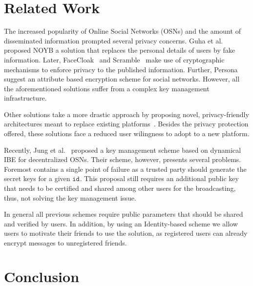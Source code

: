 \documentclass[journal]{IEEEtran}
\newcommand{\id}[1]{\ensuremath{\mathtt{id}_{#1}}}
\begin{document}
\section{Related Work}\label{sec:relwork}
The increased popularity of Online Social Networks (OSNs) and the amount of disseminated information prompted several privacy concerns. 
Guha et al.~\cite{Guha:2008} proposed NOYB a solution that replaces the personal details of users by fake information. Later, FaceCloak~\cite{Luo:2009} and Scramble~\cite{BeatoScramble} make use of cryptographic mechanisms to enforce privacy to the published information. Further, Persona suggest an attribute based encryption scheme for social networks. However, all the aforementioned solutions suffer from a complex key management infrastructure. 


Other solutions take a more drastic approach by proposing novel, privacy-friendly architectures meant to replace existing platforms~\cite{DBLP:conf/sp/CristofaroSTW12,NYT2010.Diaspora,DBLP:conf/wowmom/CutilloMO11}. Besides the privacy protection offered, these solutions face a reduced user wilingness to adopt to a new platform.

Recently, Jung et al.~\cite{jung} proposed a key management scheme based on dynamical IBE for decentralized OSNs. Their scheme, however, presents several problems. Foremost contains a single point of failure as a trusted party should generate the secret keys for a given \id{}. This proposal still requires an additional public key that needs to be certified and shared among other users for the broadcasting, thus, not solving the key management issue.

In general all previous schemes require public parameters that should be shared and verified by users. In addition, by using an Identity-based scheme we allow users to motivate their friends to use the solution, as registered users can already encrypt messages to unregistered friends.



\section{Conclusion}\label{sec:conc}
\end{document}
